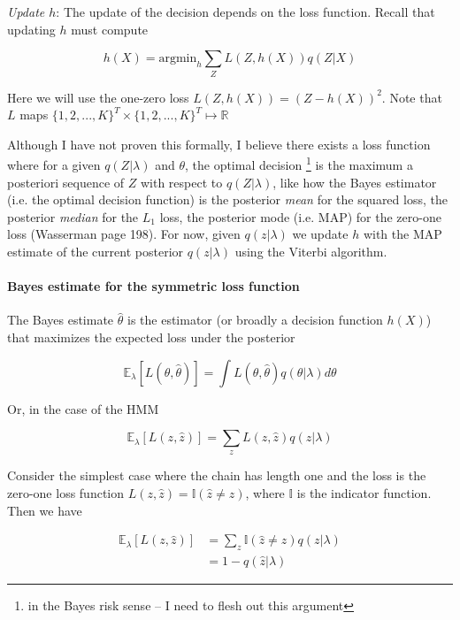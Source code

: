 \documentclass{article}
\begin{document}
\textit{Update $h$}: The update of the decision depends on the loss function. Recall that updating $h$ must compute

\begin{equation}
h(X) = \mathrm{argmin}_h \sum_Z L(Z, h(X)) q(Z|X)
\end{equation}

Here we will use the one-zero loss $L(Z, h(X)) = (Z - h(X))^2$. Note that $L$ maps $\{1,2,...,K\}^T \times \{1,2,...,K\}^T \mapsto \mathbb{R}$

Although I have not proven this formally, I believe there exists a loss function where for a given $q(Z|\lambda)$ and $\theta$, the optimal decision \footnote{in the Bayes risk sense -- I need to flesh out this argument} is the maximum a posteriori sequence of $Z$ with respect to $q(Z|\lambda)$, like how the Bayes estimator (i.e. the optimal decision function) is the posterior \textit{mean} for the squared loss, the posterior \textit{median} for the $L_1$ loss, the posterior mode (i.e. MAP) for the zero-one loss (Wasserman page 198). For now, given $q(z|\lambda)$ we update $h$ with the MAP estimate of the current posterior $q(z|\lambda)$ using the Viterbi algorithm.

\paragraph{Bayes estimate for the symmetric loss function}
The Bayes estimate $\hat{\theta}$ is the estimator (or broadly a decision function $h(X)$) that maximizes the expected loss under the posterior

\begin{equation}
\mathbb{E}_\lambda[L(\theta, \hat{\theta})] = \int L(\theta, \hat{\theta}) q(\theta|\lambda) d\theta   
\end{equation}

Or, in the case of the HMM

\begin{equation}
\mathbb{E}_\lambda[L(z, \hat{z})] = \sum_z L(z, \hat{z}) q(z|\lambda) 
\end{equation}

Consider the simplest case where the chain has length one and the loss is the zero-one loss function $L(z, \hat{z}) = \mathbb{I}(\hat{z} \neq z)$, where $\mathbb{I}$ is the indicator function. Then we have

\begin{align}
\mathbb{E}_\lambda[L(z, \hat{z})] &= \sum_{z} \mathbb{I}(\hat{z} \neq z) q(z|\lambda) \\
                                  &= 1 - q(\hat{z}|\lambda)
\end{align}
\end{document}

